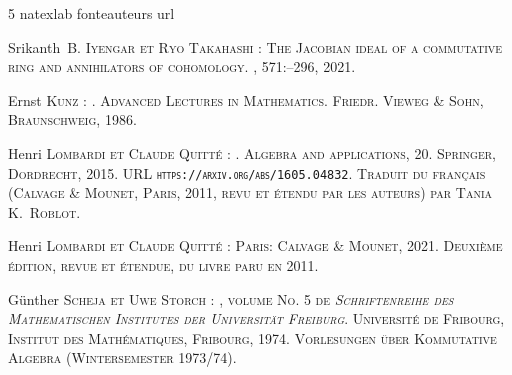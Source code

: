 \documentclass[12pt,twoside,a4paper]{article}
\begin{document}

%
\begin{thebibliography}{5}
\expandafter\ifx\csname natexlab\endcsname\relax\def\natexlab#1{#1}\fi
\expandafter\ifx\csname fonteauteurs\endcsname\relax
\def\fonteauteurs{\scshape}\fi
\expandafter\ifx\csname url\endcsname\relax
  \def\url#1{{\tt #1}}%
    \fi

Srikanth~B. \bgroup\fonteauteurs\bgroup Iyengar\egroup\egroup{} et Ryo
  \bgroup\fonteauteurs\bgroup Takahashi\egroup\egroup{} :
\newblock The {J}acobian ideal of a commutative ring and annihilators of
  cohomology.
, 571\string:--296, 2021.

Ernst \bgroup\fonteauteurs\bgroup Kunz\egroup\egroup{} :
.
\newblock Advanced Lectures in Mathematics. Friedr. Vieweg \& Sohn,
  Braunschweig, 1986.

Henri \bgroup\fonteauteurs\bgroup Lombardi\egroup\egroup{} et Claude
  \bgroup\fonteauteurs\bgroup Quitté\egroup\egroup{} :
.
\newblock Algebra and applications, 20. Springer, Dordrecht, 2015.
\newblock URL \url{https://arxiv.org/abs/1605.04832}.
\newblock Traduit du français (Calvage \& Mounet, Paris, 2011, revu et étendu
  par les auteurs) par Tania K.~Roblot.

Henri \bgroup\fonteauteurs\bgroup {Lombardi}\egroup\egroup{} et Claude
  \bgroup\fonteauteurs\bgroup {Quitté}\egroup\egroup{} :
\newblock Paris: Calvage \& Mounet, 2021.
\newblock Deuxième édition, revue et étendue, du livre paru en 2011.

Günther \bgroup\fonteauteurs\bgroup Scheja\egroup\egroup{} et Uwe
  \bgroup\fonteauteurs\bgroup Storch\egroup\egroup{} :
, volume No. 5 de {\em
  Schriftenreihe des Mathematischen Institutes der Universit\"at Freiburg}.
\newblock Universit\'e{} de Fribourg, Institut des Math\'ematiques, Fribourg,
  1974.
\newblock Vorlesungen \"uber Kommutative Algebra (Wintersemester 1973/74).

\end{thebibliography}
\end{document}
